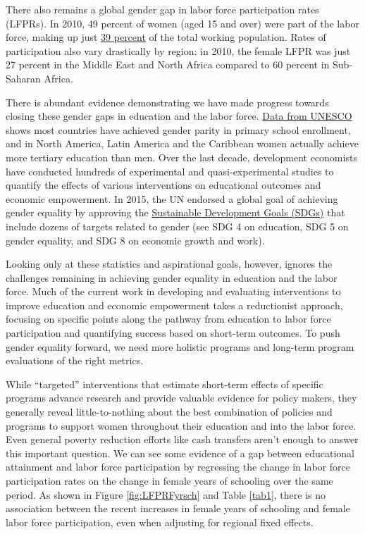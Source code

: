 \documentclass[11pt]{article}
\begin{document}
There also remains a global gender gap in labor force participation rates (LFPRs). In 2010, 49 percent of women (aged 15 and over) were part of the labor force, making up just \href{https://wol.iza.org/articles/female-labor-force-participation-in-developing-countries/long}{39 percent} of the total working population. Rates of participation also vary drastically by region: in 2010, the female LFPR was just 27 percent in the Middle East and North Africa compared to 60 percent in Sub-Saharan Africa. 

There is abundant evidence demonstrating we have made progress towards closing these gender gaps in education and the labor force. \href{https://data.unicef.org/topic/gender/gender-disparities-in-education/}{Data from UNESCO} shows most countries have achieved gender parity in primary school enrollment, and in North America, Latin America and the Caribbean women actually achieve more tertiary education than men. Over the last decade, development economists have conducted hundreds of experimental and quasi-experimental studies to quantify the effects of various interventions on educational outcomes and economic empowerment. In 2015, the UN endorsed a global goal of achieving gender equality by approving the
\href{https://sustainabledevelopment.un.org/}{Sustainable Development Goals (SDGs)} that include dozens of targets related to gender (see SDG 4 on education, SDG 5 on gender equality, and SDG 8 on economic growth and work). 

Looking only at these statistics and aspirational goals, however, ignores the challenges remaining in achieving gender equality in education and the labor force. Much of the current work in developing and evaluating interventions to improve education and economic empowerment takes a reductionist approach, focusing on specific points along the pathway from education to labor force participation and quantifying success based on short-term outcomes. To push gender equality forward, we need more holistic programs and long-term program evaluations of the right metrics. 

While ``targeted'' interventions that estimate short-term effects of specific programs advance research and provide valuable evidence for policy makers, they generally reveal little-to-nothing about the best combination of policies and programs to support women throughout their education and into the labor force. Even general poverty reduction efforts like cash transfers aren't enough to answer this important question. We can see some evidence of a gap between educational attainment and labor force participation by regressing the change in labor force participation rates on the change in female years of schooling over the same period. As shown in Figure \ref{fig:LFPRFyrsch} and Table \ref{tab1}, there is no association between the recent increases in female years of schooling and female labor force participation, even when adjusting for regional fixed effects. 
\end{document}
